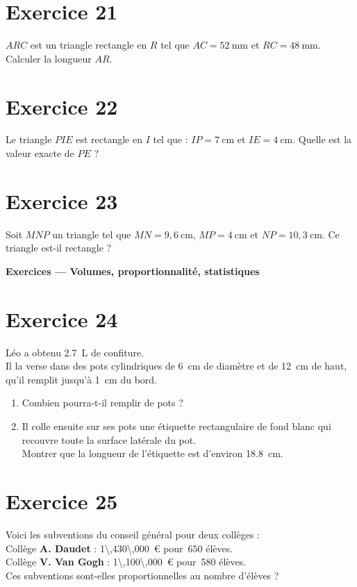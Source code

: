 \documentclass[a4paper,11pt]{article}
\begin{document}
\section*{Exercice 21}
\(ARC\) est un triangle rectangle en \(R\) tel que \(AC=52\ \text{mm}\) et \(RC=48\ \text{mm}\).  
Calculer la longueur \(AR\).


\section*{Exercice 22}
Le triangle \(PIE\) est rectangle en \(I\) tel que : \(IP=7\ \text{cm}\) et \(IE=4\ \text{cm}\).  
Quelle est la valeur exacte de \(PE\) ?


\section*{Exercice 23}
Soit \(MNP\) un triangle tel que \(MN=9{,}6\ \text{cm}\), \(MP=4\ \text{cm}\) et \(NP=10{,}3\ \text{cm}\).  
Ce triangle est-il rectangle ?

{\Large \textbf{Exercices — Volumes, proportionnalité, statistiques}}\par\medskip


\section*{Exercice 24}
Léo a obtenu \SI{2,7}{\liter} de confiture.\\
Il la verse dans des pots cylindriques de \SI{6}{\centi\meter} de diamètre et de \SI{12}{\centi\meter} de haut, qu’il remplit jusqu’à \SI{1}{\centi\meter} du bord.
\begin{enumerate}
  \item Combien pourra-t-il remplir de pots ?
  \item Il colle ensuite sur ses pots une étiquette rectangulaire de fond blanc qui recouvre toute la surface latérale du pot.\\
  Montrer que la longueur de l’étiquette est d’environ \SI{18,8}{\centi\meter}.
\end{enumerate}

\bigskip
\section*{Exercice 25}
Voici les subventions du conseil général pour deux collèges :\\[2pt]
\quad Collège \textbf{A. Daudet} : \SI{1\,430\,000}{\euro} pour \(\,650\) élèves.\\
\quad Collège \textbf{V. Van Gogh} : \SI{1\,100\,000}{\euro} pour \(\,580\) élèves.\\[2pt]
Ces subventions sont-elles proportionnelles au nombre d’élèves ?
\end{document}
